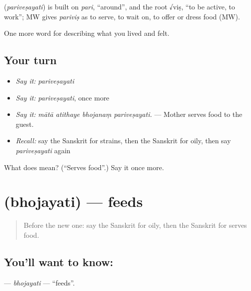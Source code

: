\begin{cousinweb}
\textbf{} (\emph{pariveṣayati}) is built on \emph{pari}, \textquotedblleft{}around\textquotedblright{}, and the root √viṣ, \textquotedblleft{}to be active, to work\textquotedblright{}; MW gives \emph{pariviṣ} as to serve, to wait on, to offer or dress food (MW).
\end{cousinweb}

\begin{grammarlens}[title={What you've built}]
One more word for describing what you lived and felt.
\end{grammarlens}

\subsection*{Your turn}
\begin{itemize}
\raggedright
  \item \emph{Say it:} \emph{pariveṣayati}
  \item \emph{Say it:} \emph{pariveṣayati}, once more
  \item \emph{Say it:} \emph{mātā atithaye bhojanaṃ pariveṣayati.} — Mother serves food to the guest.
  \item \emph{Recall:} say the Sanskrit for strains, then the Sanskrit for oily, then say \emph{pariveṣayati} again
\end{itemize}

\begin{tcolorbox}[breakable,colback=teal!4,colframe=teal!35!black,title={Before you move on}]
What does  mean? (\textquotedblleft{}Serves food\textquotedblright{}.) Say it once more.
\end{tcolorbox}
\section[\texorpdfstring{\sk{भोजयति} (bhojayati)}{भोजयति (bhojayati)}]{ (bhojayati) — feeds}

\label{lesson:SA-C514-bhojayati}



\begin{quote}
Before the new one: say the Sanskrit for oily, then the Sanskrit for serves food.
\end{quote}

\subsection*{You'll want to know: }
\textbf{} — \emph{bhojayati} — \textquotedblleft{}feeds\textquotedblright{}.

